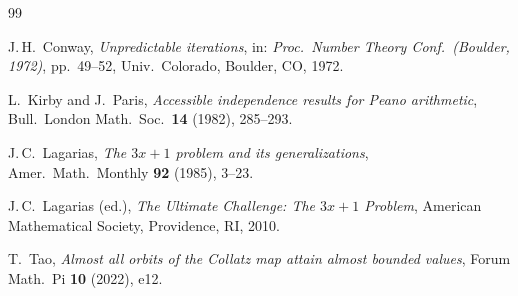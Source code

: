 \documentclass[11pt,a4paper]{article}
\theoremstyle{definition}
\theoremstyle{remark}
\begin{document}
\begin{thebibliography}{99}

J.\,H.~Conway,
\emph{Unpredictable iterations}, in:
\emph{Proc.\ Number Theory Conf.\ (Boulder, 1972)}, pp.\ 49--52,
Univ.\ Colorado, Boulder, CO, 1972.

L.~Kirby and J.~Paris,
\emph{Accessible independence results for Peano arithmetic},
Bull.\ London Math.\ Soc.\ \textbf{14} (1982), 285--293.

J.\,C.~Lagarias,
\emph{The $3x+1$ problem and its generalizations},
Amer.\ Math.\ Monthly \textbf{92} (1985), 3--23.

J.\,C.~Lagarias (ed.),
\emph{The Ultimate Challenge: The $3x+1$ Problem},
American Mathematical Society, Providence, RI, 2010.

T.~Tao,
\emph{Almost all orbits of the Collatz map attain almost bounded values},
Forum Math.\ Pi \textbf{10} (2022), e12.

\end{thebibliography}
\end{document}

